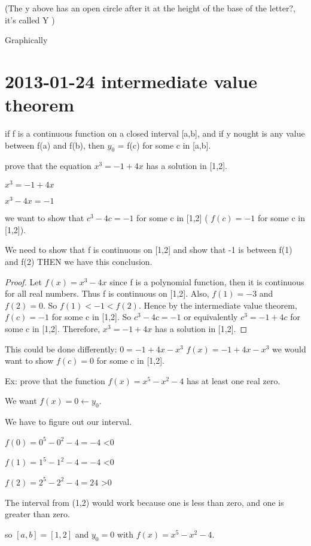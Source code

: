 \documentclass[12pt]{article}
\begin{document}
(The y above has an open circle after it at the height of the base of the letter?, it's called Y )

Graphically

\section{2013-01-24 intermediate value theorem}

if f is a continuous function on a closed interval [a,b], and if y nought is any value between f(a) and f(b),
then $y_0$ = f(c) for some c in [a,b].


prove that the equation $x^3 = -1 + 4x$ has a solution in [1,2].

$x^3 = -1 + 4x$

$x^3 - 4x = -1$

we want to show that $c^3 - 4c = -1$ for some c in [1,2] ( $f(c) = -1$ for some c in [1,2]).

We need to show that f is continuous on [1,2] and show that -1 is between f(1) and f(2) THEN we have this conclusion.

\begin{proof}
Let $f(x) = x^3 - 4x$ since f is a polynomial function, then it is continuous for all real numbers. Thus f is
continuous on [1,2]. Also, $f(1) = -3$ and $f(2) = 0$. So $f(1) < -1 < f(2)$. Hence by the intermediate value
theorem, $f(c) = -1$ for some c in [1,2]. So $c^3-4c=-1$ or equivalently $c^3=-1+4c$ for some c in
[1,2]. Therefore, $x^3 = -1 + 4x$ has a solution in [1,2].
\end{proof}
This could be done differently:
$0 = -1 + 4x - x^3$
$f(x) = -1 + 4x - x^3$
we would want to show $f(c) = 0$ for some c in [1,2].


Ex: prove that the function $f(x) = x^5 - x^2 - 4$ has at least one real zero.

We want $f(x) = 0 \leftarrow y_0$. 

We have to figure out our interval.

$f(0) = 0^5 - 0^2 - 4 = -4$ <0

$f(1) = 1^5 - 1^2 - 4 = -4$ <0

$f(2) = 2^5 - 2^2 - 4 = 24$ >0

The interval from (1,2) would work because one is less than zero, and one is greater than zero.

so $[a,b] = [1,2]$ and $y_0 = 0$ with $f(x) = x^5 - x^2 - 4$.
\end{document}
